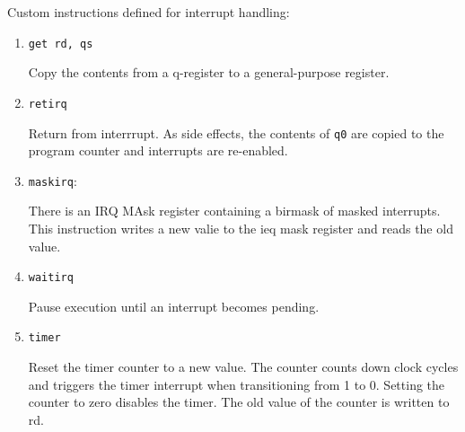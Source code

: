 Custom instructions defined for interrupt handling: \begin{enumerate}
      \item \texttt{get rd, qs}
      
      Copy the contents from a q-register to a general-purpose register. 
      \item \texttt{retirq}
      
      Return from interrrupt. As side effects, the contents of \texttt{q0} are copied to the program counter and interrupts are re-enabled.
      \item \texttt{maskirq}: 
      
      There is an IRQ MAsk register  containing a birmask of masked interrupts. This instruction writes a new valie to the ieq mask register and reads the old value. 

      \item \texttt{waitirq}
      
      Pause execution until an interrupt becomes pending. 

      \item \texttt{timer}
      
      Reset the timer counter to a new value. The counter counts down clock cycles and triggers the timer interrupt when transitioning from 1 to 0. Setting the counter to zero disables the timer. The old value of the counter is written to rd.
\end{enumerate}